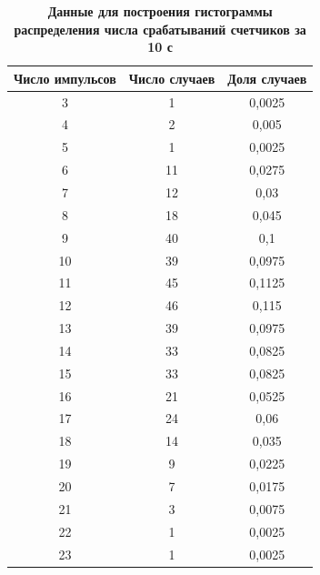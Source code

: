\documentclass[a4paper, 12pt]{article}
\begin{document}
\begin{table}
\caption{\textbf{Данные для построения гистограммы распределения числа срабатываний счетчиков за 10 с}}
\begin{tabular}{|c|c|c|}
\hline 
\textbf{Число импульсов} & \textbf{Число случаев} & \textbf{Доля случаев} \\ 
\hline 
3 & 1 & 0,0025 \\ 
\hline 
4 & 2 & 0,005 \\ 
\hline 
5 & 1 & 0,0025 \\ 
\hline 
6 & 11 & 0,0275 \\ 
\hline 
7 & 12 & 0,03 \\ 
\hline 
8 & 18 & 0,045 \\ 
\hline 
9 & 40 & 0,1 \\ 
\hline 
10 & 39 & 0,0975 \\ 
\hline 
11 & 45 & 0,1125 \\ 
\hline 
12 & 46 & 0,115 \\ 
\hline 
13 & 39 & 0,0975 \\ 
\hline 
14 & 33 & 0,0825 \\ 
\hline 
15 & 33 & 0,0825 \\ 
\hline 
16 & 21 & 0,0525 \\ 
\hline 
17 & 24 & 0,06 \\ 
\hline 
18 & 14 & 0,035 \\ 
\hline 
19 & 9 & 0,0225 \\ 
\hline 
20 & 7 & 0,0175 \\ 
\hline 
21 & 3 & 0,0075 \\ 
\hline 
22 & 1 & 0,0025 \\
\hline  
23 & 1 & 0,0025 \\ 
\hline 
\end{tabular} 
\end{table}
\newpage
\end{document}
